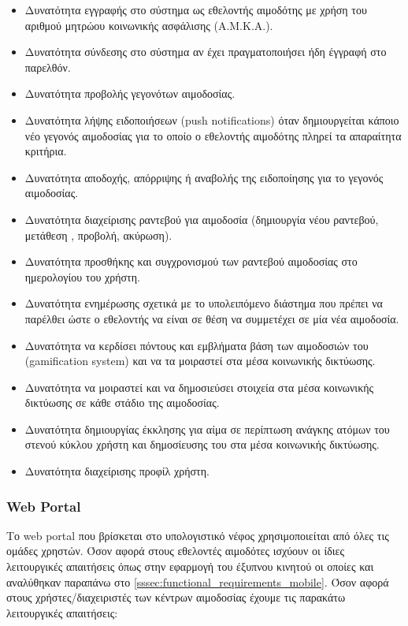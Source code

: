 			\begin{itemize}
				\item Δυνατότητα εγγραφής στο σύστημα ως εθελοντής αιμοδότης με χρήση του αριθμού μητρώου κοινωνικής ασφάλισης (Α.Μ.Κ.Α.).
				\item Δυνατότητα σύνδεσης στο σύστημα αν έχει πραγματοποιήσει ήδη έγγραφή στο παρελθόν.
				\item Δυνατότητα προβολής γεγονότων αιμοδοσίας.
				\item Δυνατότητα λήψης ειδοποιήσεων (push notifications) όταν δημιουργείται κάποιο νέο γεγονός αιμοδοσίας για το οποίο ο εθελοντής αιμοδότης πληρεί τα απαραίτητα κριτήρια.
				\item Δυνατότητα αποδοχής, απόρριψης ή αναβολής της ειδοποίησης για το γεγονός αιμοδοσίας.
				\item Δυνατότητα διαχείρισης ραντεβού για αιμοδοσία (δημιουργία νέου ραντεβού, μετάθεση , προβολή, ακύρωση).
				\item Δυνατότητα προσθήκης και συγχρονισμού των ραντεβού αιμοδοσίας στο ημερολογίου του χρήστη.
				\item Δυνατότητα ενημέρωσης σχετικά με το υπολειπόμενο διάστημα που πρέπει να παρέλθει ώστε ο εθελοντής να είναι σε θέση να συμμετέχει σε μία νέα αιμοδοσία.
				\item Δυνατότητα να κερδίσει πόντους και εμβλήματα βάση των αιμοδοσιών του (gamification system) και να τα μοιραστεί στα μέσα κοινωνικής δικτύωσης.
				\item Δυνατότητα να μοιραστεί και να δημοσιεύσει στοιχεία στα μέσα κοινωνικής δικτύωσης σε κάθε στάδιο της αιμοδοσίας.
				\item Δυνατότητα δημιουργίας έκκλησης για αίμα σε περίπτωση ανάγκης ατόμων του στενού κύκλου χρήστη και δημοσίευσης του στα μέσα κοινωνικής δικτύωσης.
				\item Δυνατότητα διαχείρισης προφίλ χρήστη.

			\end{itemize}

			\subsubsection{Web Portal} \label{sssec:functional_requirements_web}
			
				Το web portal που βρίσκεται στο υπολογιστικό νέφος χρησιμοποιείται από όλες τις ομάδες χρηστών. Όσον αφορά στους εθελοντές αιμοδότες ισχύουν οι ίδιες λειτουργικές απαιτήσεις όπως στην εφαρμογή του έξυπνου κινητού οι οποίες και αναλύθηκαν παραπάνω στο \ref{sssec:functional_requirements_mobile}. Όσον αφορά στους χρήστες/διαχειριστές των κέντρων αιμοδοσίας έχουμε τις παρακάτω λειτουργικές απαιτήσεις:
				
